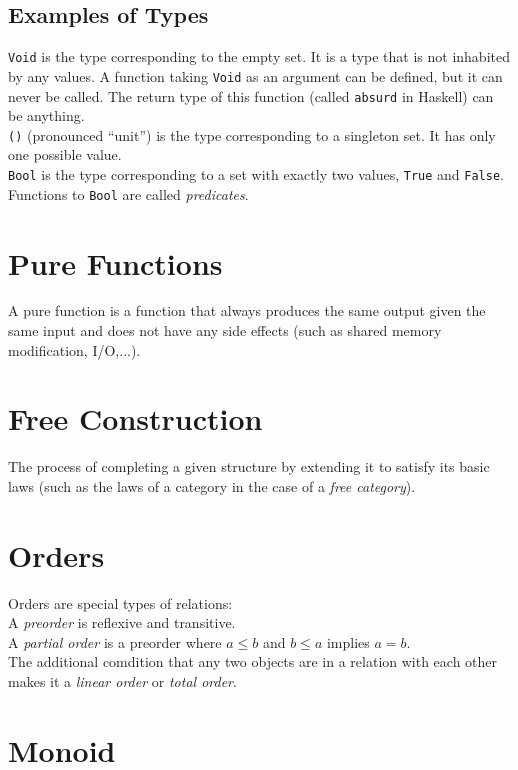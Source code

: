 \documentclass[12pt]{article}
\begin{document}
\subsection{Examples of Types}
\texttt{Void} is the type corresponding to the empty set. It is a type that is not inhabited by any values. A function taking \texttt{Void} as an argument can be defined, but it can never be called. The return type of this function (called \texttt{absurd} in Haskell) can be anything. \\

\texttt{()} (pronounced ``unit'') is the type corresponding to a singleton set. It has only one possible value. \\

\texttt{Bool} is the type corresponding to a set with exactly two values, \texttt{True} and \texttt{False}. Functions to \texttt{Bool} are called \textit{predicates}.

\section{Pure Functions}
A pure function is a function that always produces the same output given the same input and does not have any side effects (such as shared memory modification, I/O,...). 

\section{Free Construction}
The process of completing a given structure by extending it to satisfy its basic laws (such as the laws of a category in the case of a \textit{free category}).

\section{Orders}
Orders are special types of relations: \\

A \textit{preorder} is reflexive and transitive.\\
A \textit{partial order} is a preorder where $a \leq b$ and $b \leq a$ implies $a = b$.\\
The additional comdition that any two objects are in a relation with each other makes it a \textit{linear order} or \textit{total order}.

\section{Monoid}
\end{document}
